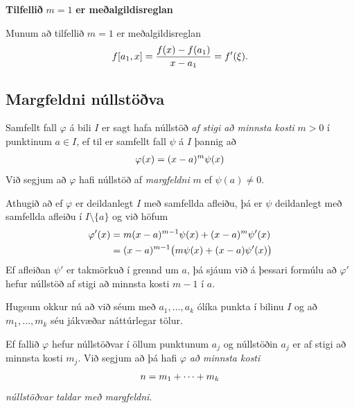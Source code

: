 \documentclass[letterpaper,10pt,icelandic]{sphinxmanual}
\begin{document}
\textbf{Tilfellið} \(m=1\) \textbf{er meðalgildisreglan}

Munum að tilfellið \(m=1\) er meðalgildisreglan
\begin{gather}
\begin{split}f[a_1,x]=\dfrac{f(x)-f(a_1)}{x-a_1}=f'(\xi).\end{split}\notag
\end{gather}

\subsection{Margfeldni núllstöðva}
\label{kafli03:margfeldni-nullstova}
Samfellt fall \(\varphi\) á bili \(I\) er sagt hafa núllstöð \emph{af
stigi að minnsta kosti} \(m>0\) í punktinum \(a\in I\), ef til
er samfellt fall \(\psi\) á \(I\) þannig að
\begin{gather}
\begin{split}\varphi(x)=(x-a)^m\psi(x)\end{split}\notag
\end{gather}
Við segjum að \(\varphi\) hafi núllstöð af \emph{margfeldni} \(m\) ef
\(\psi(a)\neq0\).

Athugið að ef \(\varphi\) er deildanlegt \(I\) með samfellda
afleiðu, þá er \(\psi\) deildanlegt með samfellda afleiðu í
\(I\setminus\{a\}\) og við höfum
\begin{gather}
\begin{split}\begin{aligned}
  \varphi'(x)&=m(x-a)^{m-1}\psi(x)+(x-a)^m\psi'(x)\\
&= (x-a)^{m-1} \big(m\psi(x)+(x-a)\psi'(x)\big)\end{aligned}\end{split}\notag
\end{gather}
Ef afleiðan \(\psi'\) er takmörkuð í grennd um \(a\), þá sjáum
við á þessari formúlu að \(\varphi'\) hefur núllstöð af stigi að
minnsta kosti \(m-1\) í \(a\).

Hugsum okkur nú að við séum með \(a_1,\dots,a_k\) ólíka punkta í
bilinu \(I\) og að \(m_1,\dots,m_k\) séu jákvæðar náttúrlegar
tölur.

Ef fallið \(\varphi\) hefur núllstöðvar í öllum punktunum
\(a_j\) og núllstöðin \(a_j\) er af stigi að minnsta kosti
\(m_j\). Við segjum að þá hafi \(\varphi\) \emph{að minnsta kosti}
\begin{gather}
\begin{split}n=m_1+\cdots+m_k\end{split}\notag
\end{gather}
\emph{núllstöðvar taldar með margfeldni}.
\end{document}
